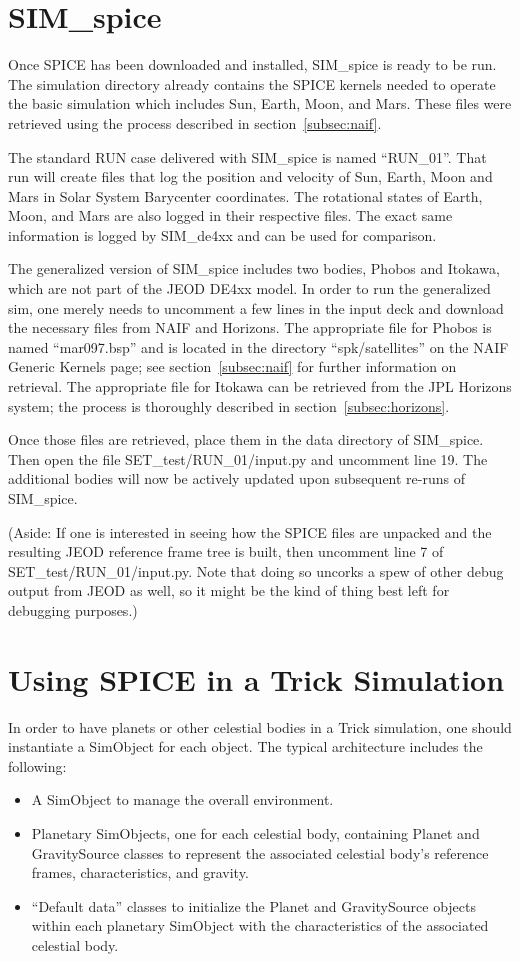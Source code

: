 \section{SIM\_spice}
Once SPICE has been downloaded and installed, SIM\_spice is ready to be run.
The simulation directory already contains the SPICE kernels needed to operate the
basic simulation which includes Sun, Earth, Moon, and Mars.  These files were
retrieved using the process described in section~\ref{subsec:naif}.

The standard RUN case delivered with SIM\_spice is named ``RUN\_01''. That run
will create files that log the position and velocity of Sun, Earth, Moon and
Mars in Solar System Barycenter coordinates. The rotational states of Earth,
Moon, and Mars are also logged in their respective files. The exact same
information is logged by SIM\_de4xx and can be used for comparison.

The generalized version of SIM\_spice includes two bodies, Phobos and Itokawa,
which are not part of the JEOD DE4xx model. In order to run the generalized sim,
one merely needs to uncomment a few lines in the input deck and download the
necessary files from NAIF and Horizons.  The appropriate file for Phobos is
named ``mar097.bsp'' and is located in the directory ``spk/satellites'' on
the NAIF Generic Kernels page; see section~\ref{subsec:naif} for further
information on retrieval.  The appropriate file for Itokawa can be retrieved
from the JPL Horizons system; the process is thoroughly described in
section~\ref{subsec:horizons}.

Once those files are retrieved, place them in the data directory of
SIM\_spice. Then open the file SET\_test/RUN\_01/input.py and uncomment
line 19. The additional bodies will now be actively updated upon subsequent
re-runs of SIM\_spice.

(Aside: If one is interested in seeing how the SPICE files are unpacked
and the resulting JEOD reference frame tree is built, then uncomment line 7 of
SET\_test/RUN\_01/input.py. Note that doing so uncorks a spew of other debug
output from JEOD as well, so it might be the kind of thing best left for
debugging purposes.)


\section{Using SPICE in a Trick Simulation}\label{sec:builder}
In order to have planets or other celestial bodies in a Trick simulation,
one should instantiate a SimObject for each object. The typical architecture
includes the following:
\begin{itemize}
\item A SimObject to manage the overall environment.
\item Planetary SimObjects, one for each celestial body, containing Planet
and GravitySource classes to represent the associated celestial body's reference
frames, characteristics, and gravity.
\item ``Default data'' classes to initialize the Planet and GravitySource objects
within each planetary SimObject with the characteristics of the associated
celestial body.
\end{itemize}


